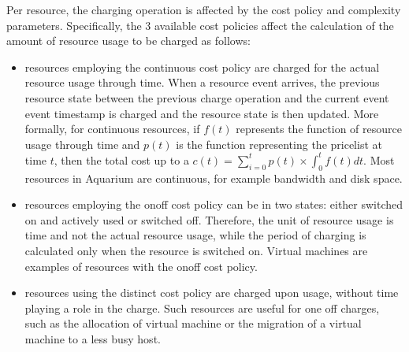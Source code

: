\documentclass[preprint,10pt]{sigplanconf}
\begin{document}
Per resource, the charging operation is affected by the cost policy and complexity
parameters. Specifically, the 3 available cost policies affect the calculation 
of the amount of resource usage to be charged as follows:

\begin{itemize}
    \item resources employing the \textsf{continuous} cost policy are charged for
        the actual resource usage through time. When a resource event arrives,
        the previous resource state between the previous charge operation and the
        current event event timestamp is charged and the resource state is then
        updated. More formally, for continuous resources, if $f(t)$ represents
        the function of resource usage through time and $p(t)$ is the function
        representing the pricelist at time $t$, 
        then the total cost up to a 
        $c(t) = \sum_{i=0}^{t} {p(t) \times \int_0^{t}{f(t)dt}}$. Most resources
        in Aquarium are continuous, for example bandwidth and disk space.

    \item resources employing the \textsf{onoff} cost policy can be in two states:
        either switched on and actively used or switched off. Therefore, the unit
        of resource usage is time and not the actual resource usage, while the
        period of charging is calculated only when the resource is switched on.
        Virtual machines are examples of resources with the \textsf{onoff} cost
        policy.

    \item resources using the \textsf{distinct} cost policy are charged
        upon usage, without time playing a role in the charge. Such resources
        are useful for one off charges, such as the allocation of
        virtual machine or the migration of a virtual machine to a less busy
        host.

\end{itemize}
\end{document}

